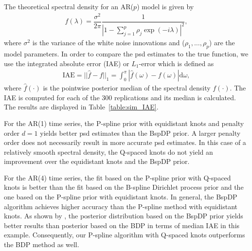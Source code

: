 \documentclass[twocolumn,final]{svjour3}
\begin{document}
The theoretical spectral density for an AR($p$) model is given by
\begin{align*}
f(\lambda) = \dfrac{\sigma^2}{2 \pi} \dfrac{1}{|1-\sum_{j=1}^{p}\rho_j \exp(-i \lambda)|^2},
\end{align*}
where $\sigma^2$ is the variance of the white noise innovations and ($\rho_1, \dots, \rho_p$) are the model parameters.  In order to compare the psd estimates  to the true function, we use the integrated absolute error (IAE) or $L_1$-error which is defined as
\begin{align*}
\text{IAE} = || \widehat{f} - f ||_1 = \int_{0}^{\pi} |\widehat{f}(\omega)-f(\omega)|\text{d}\omega,
\end{align*}
where $\widehat{f}(\cdot)$ is the pointwise posterior median of the spectral density $f(\cdot)$.   The IAE is computed for each of the 300 replications and its median is calculated.  
The results are displayed in Table~\ref{table:sim_IAE}.

For the AR(1) time series, the P-spline prior with equidistant knots and penalty order $d=1$ yields better psd estimates than the BspDP prior.
A larger penalty order does not necessarily result in more accurate psd estimates. In this case of a relatively smooth spectral density, the Q-spaced knots do not yield an improvement over the equidistant knots and the BspDP prior.




For the AR(4) time series, the fit based on the P-spline prior with Q-spaced knots is better than the fit based on the B-spline Dirichlet process prior and the one based on the P-spline prior with equidistant knots.
 In general, the BspDP algorithm achieves higher accuracy than the P-spline method with equidistant knots.  As shown by \cite{Edwards2019}, the posterior distribution based on the BspDP prior yields better results than posterior based on the BDP in terms of median IAE in this example.  Consequently, our P-spline algorithm with Q-spaced knots outperforms the BDP method as well.
\end{document}
